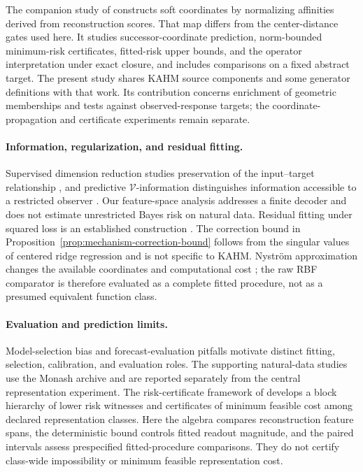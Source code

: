 The companion study of \citet{KumarKargaran2026Limits} constructs soft
coordinates by normalizing affinities derived from reconstruction scores.
That map differs from the center-distance gates used here. It studies
successor-coordinate prediction, norm-bounded minimum-risk certificates,
fitted-risk upper bounds, and the operator interpretation under exact
closure, and includes comparisons on a fixed abstract target.
The present study shares KAHM source components and some generator
definitions with that work. Its contribution concerns enrichment of
geometric memberships and tests against observed-response targets;
the coordinate-propagation and certificate experiments remain separate.

\paragraph{Information, regularization, and residual fitting.}
Supervised dimension reduction studies preservation of the input--target
relationship \citep{Fukumizu2004SDR}, and predictive
$\mathcal V$-information distinguishes information accessible to a
restricted observer \citep{Xu2020Usable}. Our feature-space analysis
addresses a finite decoder and does not estimate unrestricted Bayes
risk on natural data. Residual fitting under squared loss is an
established construction \citep{Buhlmann2003L2}. The correction bound
in Proposition~\ref{prop:mechanism-correction-bound} follows from the
singular values of centered ridge regression and is not specific to
KAHM. Nystr\"om approximation changes the available coordinates and
computational cost \citep{Williams2001Nystrom,Rudi2015Nystrom}; the raw
RBF comparator is therefore evaluated as a complete fitted procedure,
not as a presumed equivalent function class.

\paragraph{Evaluation and prediction limits.}
Model-selection bias \citep{Cawley2010Selection} and forecast-evaluation
pitfalls \citep{Hewamalage2023Evaluation} motivate distinct fitting,
selection, calibration, and evaluation roles. The supporting natural-data
studies use the Monash archive \citep{Godahewa2021Monash} and are reported
separately from the central representation experiment.
The risk-certificate framework of \citet{KumarKargaran2026RiskCertificates}
develops a block hierarchy of lower risk witnesses and certificates of
minimum feasible cost among declared representation classes. Here the
algebra compares reconstruction feature spans, the deterministic bound
controls fitted readout magnitude, and the paired intervals assess
prespecified fitted-procedure comparisons. They do not certify class-wide impossibility or
minimum feasible representation cost.

